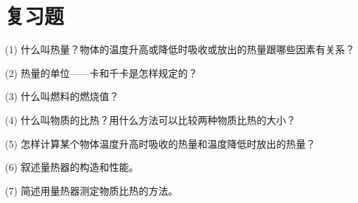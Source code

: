 \section*{复习题}

(1) 什么叫热量？物体的温度升高或降低时吸收或放出的热量跟哪些因素有关系？

(2) 热量的单位——卡和千卡是怎样规定的？

(3) 什么叫燃料的燃烧值？

(4) 什么叫物质的比热？用什么方法可以比较两种物质比热的大小？

(5) 怎样计算某个物体温度升高时吸收的热量和温度降低时放出的热量？

(6) 叙述量热器的构造和性能。

(7) 简述用量热器测定物质比热的方法。

